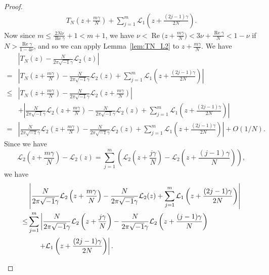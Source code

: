 \documentclass[a4paper,dvipdfmx]{amsart}
\theoremstyle{plain}
\theoremstyle{definition}
\theoremstyle{remark}
\renewcommand{\L}{\mathcal{L}}
\renewcommand{\Re}{\operatorname{Re}}
\renewcommand{\i}{\sqrt{-1}}
\numberwithin{equation}{section}
\begin{document}
\begin{proof}
\begin{equation*}
\begin{split}
  T_{N}\left(z+\frac{m\gamma}{N}\right)
  +
  \sum_{j=1}^{m}\L_1\left(z+\frac{(2j-1)\gamma}{2N}\right).
\end{split}
\end{equation*}
Now since $m\le\frac{2N\nu}{\Re\gamma}+1<m+1$, we have $\nu<\Re\bigl(z+\frac{m\gamma}{N}\bigr)<3\nu+\frac{\Re\gamma}{N}<1-\nu$ if $N>\frac{\Re\gamma}{1-4\nu}$, and so we can apply Lemma~\ref{lem:TN_L2} to $z+\frac{m\gamma}{N}$.
We have
\begin{align*}
  &\left|
    T_{N}(z)-\frac{N}{2\pi\i\gamma}\L_2(z)
  \right|
  \\
  =&
  \left|
    T_{N}\left(z+\frac{m\gamma}{N}\right)
    -
    \frac{N}{2\pi\i\gamma}\L_2(z)
    +
    \sum_{j=1}^{m}\L_1\left(z+\frac{(2j-1)\gamma}{2N}\right)
  \right|
  \\
  \le&
  \left|
    T_{N}\left(z+\frac{m\gamma}{N}\right)
    -
    \frac{N}{2\pi\i\gamma}\L_2\left(z+\frac{m\gamma}{N}\right)
  \right|
  \\
  &+
  \left|
    \frac{N}{2\pi\i\gamma}\L_2\left(z+\frac{m\gamma}{N}\right)
    -
    \frac{N}{2\pi\i\gamma}\L_2(z)
    +
    \sum_{j=1}^{m}\L_1\left(z+\frac{(2j-1)\gamma}{2N}\right)
  \right|
  \\
  =&
  \left|
    \frac{N}{2\pi\i\gamma}\L_2\left(z+\frac{m\gamma}{N}\right)
    -
    \frac{N}{2\pi\i\gamma}\L_2(z)
    +
    \sum_{j=1}^{m}\L_1\left(z+\frac{(2j-1)\gamma}{2N}\right)
  \right|
  +O(1/N).
\end{align*}
Since we have
\begin{equation*}
  \L_2\left(z+\frac{m\gamma}{N}\right)-\L_2(z)
  =
  \sum_{j=1}^{m}
  \left(
    \L_2\left(z+\frac{j\gamma}{N}\right)
    -
    \L_2\left(z+\frac{(j-1)\gamma}{N}\right)
  \right),
\end{equation*}
we have
\begin{equation}\label{eq:sum_L2_L1}
\begin{split}
  &\left|
    \frac{N}{2\pi\i\gamma}\L_2\left(z+\frac{m\gamma}{N}\right)
    -
    \frac{N}{2\pi\i\gamma}\L_2(z)
    +
    \sum_{j=1}^{m}\L_1\left(z+\frac{(2j-1)\gamma}{2N}\right)
  \right|
  \\
  \le&
  \sum_{j=1}^{m}
  \left|
    \frac{N}{2\pi\i\gamma}\L_2\left(z+\frac{j\gamma}{N}\right)
    -
    \frac{N}{2\pi\i\gamma}\L_2\left(z+\frac{(j-1)\gamma}{N}\right)
  \right.
  \\
  &
  \phantom{\sum_{j=1}^{m}}\hfill
  \left.
    +
    \L_1\left(z+\frac{(2j-1)\gamma}{2N}\right)
  \right|.
\end{split}
\end{equation}

\end{proof}
\end{document}
